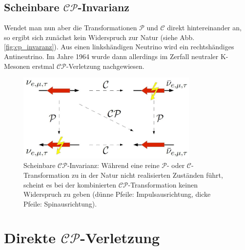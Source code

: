 \documentclass[a4paper]{scrbook}
\newcommand{\CP}{$\mathcal{CP}$}
\begin{document}
\subsection{Scheinbare $\mathcal{CP}$-Invarianz}
Wendet man nun aber die Transformationen $\mathcal{P}$ und $\mathcal{C}$ direkt hintereinander an, so ergibt sich zunächst kein Widerspruch zur Natur (siehe Abb. \ref{fig:cp_invaranz}). Aus einen linkshändigen Neutrino wird ein rechtshändiges Antineutrino. Im Jahre 1964 wurde dann allerdings im Zerfall neutraler K-Mesonen erstmal $\mathcal{CP}$-Verletzung nachgewiesen. \cite{kleinknecht}

\begin{figure}[hptb]
\centering
\includegraphics[width = 0.8\textwidth]{cp_invarianz}
\caption{Scheinbare $\mathcal{CP}$-Invarianz: Während eine reine $\mathcal{P}$- oder $\mathcal{C}$-Transformation zu in der Natur nicht realisierten Zuständen führt, scheint es bei der kombinierten $\mathcal{CP}$-Transformation keinen Widerspruch zu geben (dünne Pfeile: Impulsausrichtung, dicke Pfeile: Spinausrichtung).}
\label{fig:cp_invarianz}
\end{figure}


\section{Direkte \CP-Verletzung}
\end{document}
